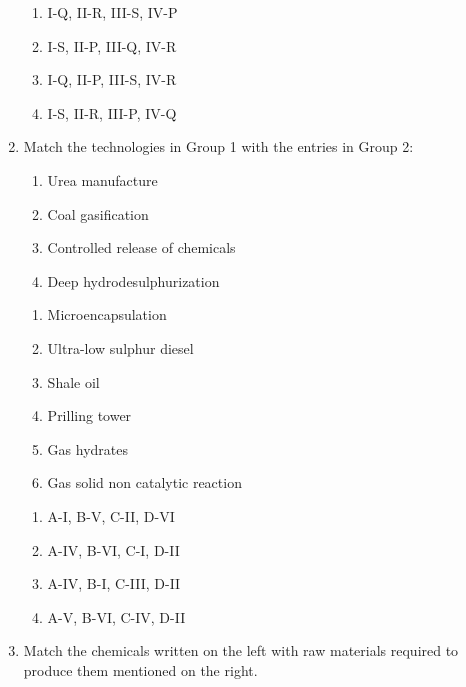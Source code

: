 \documentclass[journal,12pt,onecolumn]{IEEEtran}
\theoremstyle{remark}
\begin{document}
\begin{enumerate}
\begin{enumerate}
    \item I-Q, II-R, III-S, IV-P
     \item I-S, II-P, III-Q, IV-R
      \item I-Q, II-P, III-S, IV-R
       \item I-S, II-R, III-P, IV-Q
\end{enumerate}

    \item Match the technologies in Group 1 with the entries in Group 2:

\hfill{}
\begin{multicols}{2}
    \begin{enumerate}[label =\Alph*]
        \item Urea manufacture
         \item Coal gasification
          \item Controlled release of chemicals
           \item Deep hydrodesulphurization
    \end{enumerate}
\columnbreak
    \begin{enumerate}[label = \Roman*]
        \item Microencapsulation
         \item Ultra-low sulphur diesel
          \item Shale oil
           \item Prilling tower
           \item Gas hydrates
           \item Gas solid non catalytic reaction
    \end{enumerate}
\end{multicols}

\begin{enumerate}
    \item A-I, B-V, C-II, D-VI 
     \item A-IV, B-VI, C-I, D-II
      \item A-IV, B-I, C-III, D-II 
       \item A-V, B-VI, C-IV, D-II
\end{enumerate}

    \item Match the chemicals written on the left with raw materials required to produce them mentioned on the right.


\end{enumerate}
\end{document}
